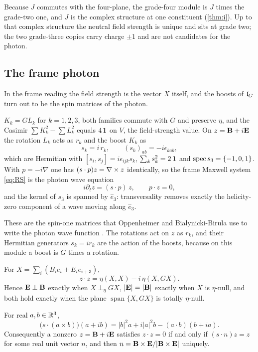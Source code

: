 Because $J$ commutes with the four-plane, the grade-four module is $J$ times the grade-two one, and $J$ is the complex structure at
one constituent (\cref{thm:i}). Up to that complex structure the neutral field strength is unique and sits at grade two; the two
grade-three copies carry charge $\pm1$ and are not candidates for the photon.

\subsection{The frame photon}

In the frame reading the field strength is the vector $X$ itself, and the boosts of $\mathfrak l_G$ turn out to be the spin matrices of the
photon.

\begin{proposition}
\label{prop:spinmatrices}
$K_k=GL_k$ for $k=1,2,3$, both families commute with $G$ and preserve $\eta$, and the Casimir $\sum K_k^2-\sum L_k^2$ equals $4\,\mathbf 1$ on
$V$, the field-strength value. On $z=\mathbf B+i\mathbf E$ the rotation $L_k$ acts as $r_k$ and the boost $K_k$ as
\[
s_k=i\,r_k,\qquad (s_k)_{ab}=-i\epsilon_{kab},
\]
which are Hermitian with $[s_i,s_j]=i\epsilon_{ijk}s_k$, $\sum_ks_k^2=2\,\mathbf 1$ and $\operatorname{spec} s_3=\{-1,0,1\}$. With $p=-i\nabla$ one has
$(s\cdot p)z=\nabla\times z$ identically, so the frame Maxwell system \eqref{eq:RS} is the photon wave equation
\[
i\partial_tz=(s\cdot p)\,z,\qquad p\cdot z=0 ,
\]
and the kernel of $s_3$ is spanned by $\hat e_3$: transversality removes exactly the helicity-zero component of a wave moving along
$\hat e_3$.
\end{proposition}

These are the spin-one matrices that Oppenheimer and Bialynicki-Birula use to write the photon wave function
\cite{Oppenheimer1931,BialynickiBirula96}. The rotations act on $z$ as $r_k$, and their Hermitian generators $s_k=ir_k$ are the action
of the boosts, because on this module a boost is $G$ times a rotation.

\begin{proposition}
\label{prop:orthframe}
For $X=\sum_i(B_ie_i+E_ie_{i+3})$,
\[
z\cdot z=\eta(X,X)-i\,\eta(X,GX).
\]
Hence $\mathbf E\perp\mathbf B$ exactly when $X\perp_\eta GX$, $|\mathbf E|=|\mathbf B|$ exactly when $X$ is $\eta$-null, and both hold exactly when the plane
$\operatorname{span}\{X,GX\}$ is totally $\eta$-null.
\end{proposition}

\begin{theorem}
\label{thm:axis}
For real $a,b\in\mathbb{R}^3$,
\[
\bigl(s\cdot(a\times b)\bigr)(a+ib)=|b|^2a+i|a|^2b-(a\cdot b)(b+ia).
\]
Consequently a nonzero $z=\mathbf B+i\mathbf E$ satisfies $z\cdot z=0$ if and only if $(s\cdot n)z=z$ for some real unit vector $n$, and then
$n=\mathbf B\times\mathbf E/|\mathbf B\times\mathbf E|$ uniquely.
\end{theorem}


